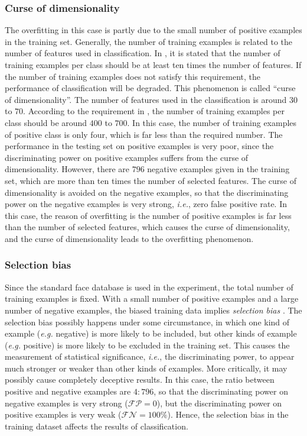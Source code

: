 \subsubsection{Curse of dimensionality}
The overfitting in this case is partly due to the small number of positive examples in the training set. Generally, the number of training examples is related to the number of features used in classification. In \cite{Jain2000}, it is stated that the number of training examples per class should be at least ten times the number of features. If the number of training examples does not satisfy this requirement, the performance of classification will be degraded. This phenomenon is called ``curse of dimensionality''. The number of features used in the classification is around $30$ to $70$. According to the requirement in \cite{Jain2000}, the number of training examples per class should be around $400$ to $700$. In this case, the number of training examples of positive class is only four, which is far less than the required number. The performance in the testing set on positive examples is very poor, since the discriminating power on positive examples suffers from the curse of dimensionality. However, there are $796$ negative examples given in the training set, which are more than ten times the number of selected features. The curse of dimensionality is avoided on the negative examples, so that the discriminating power on the negative examples is very strong, \textit{i.e.}, zero false positive rate. In this case, the reason of overfitting is the number of positive examples is far less than the number of selected features, which causes the curse of dimensionality, and the curse of dimensionality leads to the overfitting phenomenon.

\subsubsection{Selection bias}
Since the standard face database is used in the experiment, the total number of training examples is fixed. With a small number of positive examples and a large number of negative examples, the biased training data implies \textit{selection bias} \cite{Wang2006}. The selection bias possibly happens under some circumstance, in which one kind of example (\textit{e.g.} negative) is more likely to be included, but other kinds of example (\textit{e.g.} positive) is more likely to be excluded in the training set. This causes the measurement of statistical significance, \textit{i.e.}, the discriminating power, to appear much stronger or weaker than other kinds of examples. More critically, it may possibly cause completely deceptive results. In this case, the ratio between positive and negative examples are $4:796$, so that the discriminating power on negative examples is very strong ($\mathcal{FP}=0$), but the discriminating power on positive examples is very weak ($\mathcal{FN}=100\%$). Hence, the selection bias in the training dataset affects the results of classification.

